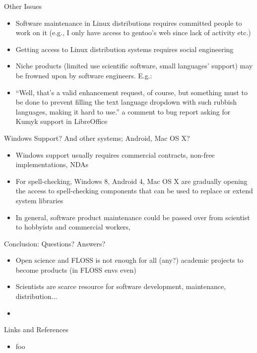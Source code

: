 \documentclass[t,12pt]{beamer}
\begin{document}
\begin{frame}{Other Issues}
    \begin{itemize}
        \item Software maintenance in Linux distributions requires committed
            people to work on it (e.g., I only have access to gentoo's web since
            lack of activity etc.)
        \item Getting access to Linux distribution systems requires social
            engineering
        \item Niche products (limited use scientific software, small
            languages' support) may be frowned upon by software engineers. E.g.:
        \item ``Well, that's a valid enhancement request, of course, but something must to be done to prevent filling the text language dropdown with \alert{such rubbish languages}, making it hard to use.'' a comment to bug report asking for Kumyk
            support in LibreOffice
    \end{itemize}
\end{frame}

\begin{frame}{Windows Support? And other systems; Android, Mac OS X?}
    \begin{itemize}
        \item Windows support usually requires commercial contracts, non-free
            implementations, NDAs
        \item For spell-checking, Windows 8, Android 4, Mac OS X are gradually
            opening the access to spell-checking components that can be used
            to replace or extend system libraries
        \item In general, software product maintenance could be passed over
            from scientist to hobbyists and commercial workers, 
    \end{itemize}
\end{frame}

\begin{frame}{Conclusion: Questions? Answers?}
    \begin{itemize}
        \item Open science and FLOSS is not enough for all (any?) academic
            projects to become products (in FLOSS envs even)
        \item Scientists are scarce resource for software development,
            maintenance, distribution...
        \item
    \end{itemize}
\end{frame}

\begin{frame}{Links and References}
    \begin{itemize}
        \item foo
    \end{itemize}
\end{frame}
\end{document}
